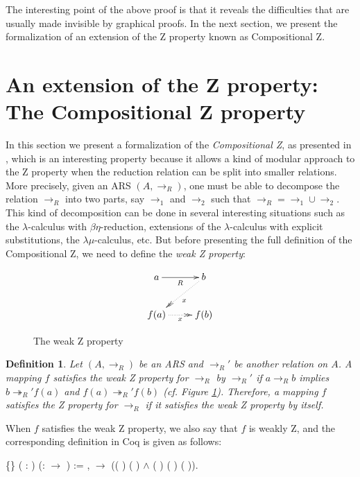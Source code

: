 \documentclass[a4paper]{article}
\newcommand{\tto}{\twoheadrightarrow}
\newtheorem{definition}{Definition}[section]
\begin{document}
The interesting point of the above proof is that it reveals the
difficulties that are usually made invisible by graphical proofs. In
the next section, we present the formalization of an extension of the
Z property known as Compositional Z.

\section{An extension of the Z property: The Compositional Z property}

In this section we present a formalization of the
\textit{Compositional Z}, as presented in \cite{Nakazawa-Fujita2016},
which is an interesting property because it allows a kind of modular
approach to the Z property when the reduction relation can be split
into smaller relations. More precisely, given an ARS $(A,\to_R)$, one
must be able to decompose the relation $\to_R$ into two parts, say
$\to_1$ and $\to_2$ such that $\to_R = \to_1\cup \to_2$. This kind of
decomposition can be done in several interesting situations such as
the $\lambda$-calculus with $\beta\eta$-reduction\cite{Ba84},
extensions of the $\lambda$-calculus with explicit
substitutions\cite{accl91}, the $\lambda\mu$-calculus\cite{Parigot92},
etc. But before presenting the full definition of the Compositional Z,
we need to define the \textit{weak Z property}:

\begin{figure}[h] \centering \[ \xymatrix{ a \ar[r]_R & b
      \ar@{.>>}[dl]^x\\ f(a) \ar@{.>>}[r]_x & f(b) \\ } \]
  \caption{The weak Z property}\label{fig:weakZ}
\end{figure}

\begin{definition} Let $(A,\to_R)$ be an ARS and $\to_R'$ be another
  relation on $A$. A mapping $f$ satisfies the {\it weak Z property}
  for $\to_R$ by $\to_R'$ if $a\to_R b$ implies $b \tto_R' f(a)$ and
  $f(a) \tto_R' f(b)$ (cf. Figure \ref{fig:weakZ}). Therefore, a
  mapping $f$ satisfies the Z property for $\to_R$ if it satisfies the
  weak Z property by itself.
\end{definition}

When $f$ satisfies the weak Z property, we also say that $f$ is weakly
Z, and the corresponding definition in Coq is given as
follows: \begin{coqdoccode} \coqdocemptyline \coqdocnoindent
    \{\}
  ( :  )
  (:  \ensuremath{\rightarrow}
  ) := \coqdockw{\ensuremath{\forall}} 
  ,   
  \ensuremath{\rightarrow} (( )
   ( ) \ensuremath{\land}
  ( ) ( )
  ( )).\coqdoceol \coqdocemptyline
\end{coqdoccode}
\end{document}
